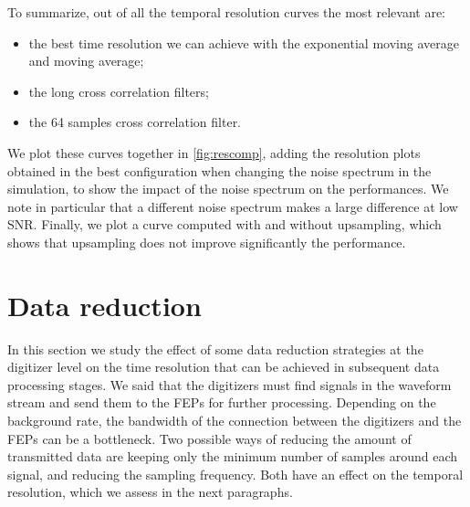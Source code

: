 To summarize, out of all the temporal resolution curves the most relevant are:
%
\begin{itemize}
    \item the best time resolution we can achieve with the exponential moving
    average and moving average;
    \item the long cross correlation filters;
    \item the 64 samples cross correlation filter.
\end{itemize}
%
We plot these curves together in \autoref{fig:rescomp}, adding the resolution
plots obtained in the best configuration when changing the noise spectrum in
the simulation, to show the impact of the noise spectrum on the performances.
We note in particular that a different noise spectrum makes a large difference
at low SNR. Finally, we plot a curve computed with and without upsampling,
which shows that upsampling does not improve significantly the performance.

\begin{figure}
    
    

\end{figure}

\section{Data reduction}

In this section we study the effect of some data reduction strategies at the
digitizer level on the time resolution that can be achieved in subsequent data
processing stages. We said that the digitizers must find signals in the
waveform stream and send them to the FEPs for further processing. Depending on
the background rate, the bandwidth of the connection between the digitizers and
the FEPs can be a bottleneck. Two possible ways of reducing the amount of
transmitted data are keeping only the minimum number of samples around each
signal, and reducing the sampling frequency. Both have an effect on the
temporal resolution, which we assess in the next paragraphs.

